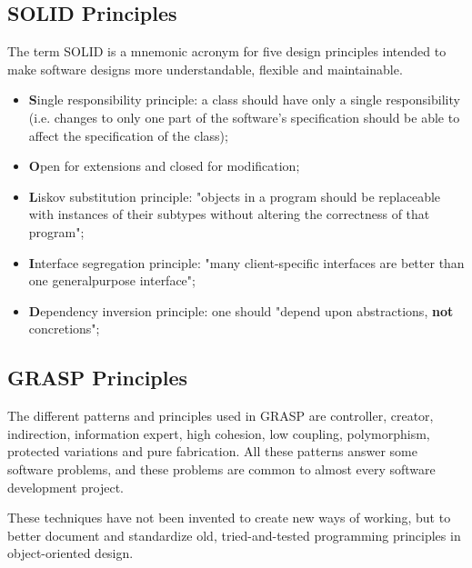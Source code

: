 \documentclass{article}
\begin{document}
		\subsection{SOLID Principles}
			The term SOLID is a mnemonic acronym for five design principles intended to make software designs more understandable, flexible and maintainable.
			\begin{itemize}
				\item \textbf{S}ingle responsibility principle: a class should have only a single responsibility (i.e. changes to only one part of the software’s specification should be able to affect the specification of the class);
				\item \textbf{O}pen for extensions and closed for modification;
				\item \textbf{L}iskov substitution principle: "objects in a program should be replaceable with instances of their subtypes without altering the correctness of that program";
				\item \textbf{I}nterface segregation principle: "many client-specific interfaces are better than one generalpurpose interface";
				\item \textbf{D}ependency inversion principle: one should "depend upon abstractions, \textbf{not} concretions";
			\end{itemize}

		\subsection{GRASP Principles}
			The different patterns and principles used in GRASP are controller, creator, indirection, information expert, high cohesion, low coupling, polymorphism, protected variations and pure fabrication. All these patterns answer some software problems, and these problems are common to almost every software development project.

			These techniques have not been invented to create new ways of working, but to better document and standardize old, tried-and-tested programming principles in object-oriented design.
\end{document}
